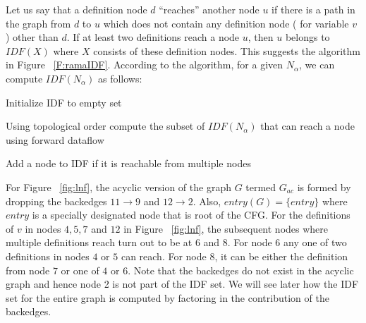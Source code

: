 Let us say that a definition node $d$ ``reaches'' another node $u$ if there is a path in the graph from $d$ to $u$ which does not contain any definition node ( for variable $v$ ) other than $d$. If at least two definitions reach a node $u$, then $u$ belongs to $IDF(X)$ where $X$ consists of these definition nodes. This suggests the algorithm in Figure ~\ref{F:ramaIDF}. According to the algorithm, for a given $N_{\alpha}$, we can compute $IDF(N_{\alpha})$ as follows:
\begin{itemize}
\item { Initialize IDF to empty set }
\item { Using topological order compute the subset of $IDF(N_{\alpha})$ that can reach a node using forward dataflow }
{\item} {Add a node to IDF if it is reachable from multiple nodes}
\end{itemize}  

    For Figure ~\ref{fig:lnf}, the acyclic version of the graph $G$ termed $G_{ac}$ is formed by dropping
    the backedges $11 \rightarrow 9$ and $12 \rightarrow 2$. Also, $entry(G) = \{entry\}$ where $entry$ is a specially designated node that is root of the CFG.
    For the definitions of $v$ in nodes $4,5,7$ and $12$ in Figure ~\ref{fig:lnf}, 
    the subsequent nodes where multiple definitions reach turn out to be at $6$ and $8$. For node $6$
    any one of two definitions in nodes $4$ or $5$ can reach. For node $8$, it can be either the
    definition from node $7$ or one of $4$ or $6$.
    Note that the backedges do not exist in the acyclic
    graph and hence node 2 is not part of the IDF set. We will see later how the IDF set for the entire
    graph is computed by factoring in the contribution of the backedges. 



    
